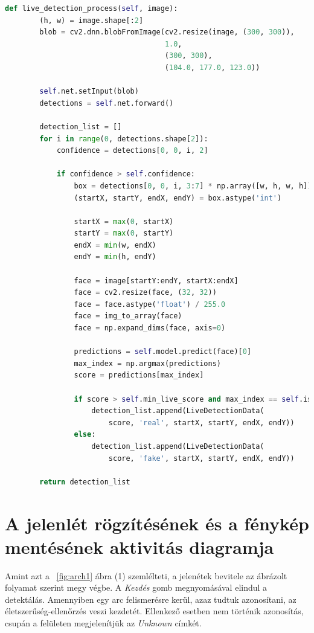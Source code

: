 \begin{lstlisting}[language=python]
def live_detection_process(self, image):
        (h, w) = image.shape[:2]
        blob = cv2.dnn.blobFromImage(cv2.resize(image, (300, 300)),
                                     1.0,
                                     (300, 300),
                                     (104.0, 177.0, 123.0))

        self.net.setInput(blob)
        detections = self.net.forward()

        detection_list = []
        for i in range(0, detections.shape[2]):
            confidence = detections[0, 0, i, 2]

            if confidence > self.confidence:
                box = detections[0, 0, i, 3:7] * np.array([w, h, w, h])
                (startX, startY, endX, endY) = box.astype('int')

                startX = max(0, startX)
                startY = max(0, startY)
                endX = min(w, endX)
                endY = min(h, endY)

                face = image[startY:endY, startX:endX]
                face = cv2.resize(face, (32, 32))
                face = face.astype('float') / 255.0
                face = img_to_array(face)
                face = np.expand_dims(face, axis=0)
            
                predictions = self.model.predict(face)[0]
                max_index = np.argmax(predictions)
                score = predictions[max_index]

                if score > self.min_live_score and max_index == self.is_live:
                    detection_list.append(LiveDetectionData(
                        score, 'real', startX, startY, endX, endY))
                else:
                    detection_list.append(LiveDetectionData(
                        score, 'fake', startX, startY, endX, endY))
                        
        return detection_list
\end{lstlisting}

\newpage

\section{A jelenlét rögzítésének és a fénykép mentésének aktivitás diagramja}

Amint azt a ~\ref{fig:arch1} ábra (1) szemlélteti, a jelenétek bevitele az ábrázolt folyamat szerint megy végbe. A \textit{Kezdés} gomb megnyomásával elindul a detektálás. Amennyiben egy arc felismerésre kerül, azaz tudtuk azonosítani, az életszerűség-ellenőrzés veszi kezdetét. Ellenkező esetben nem történik azonosítás, csupán a felületen megjelenítjük az \textit{Unknown} címkét.

